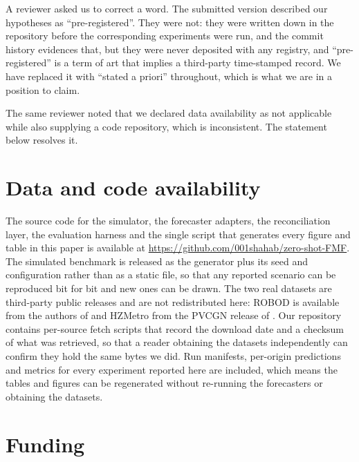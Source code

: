 \documentclass[11pt]{article}
\theoremstyle{plain}
\theoremstyle{definition}
\theoremstyle{remark}
\newif\ifrevisionmarkup
\newcommand{\new}[1]{\ifrevisionmarkup\textcolor{revision}{#1}\else#1\fi}
\begin{document}
\new{A reviewer asked us to correct a word. The submitted version described our hypotheses as ``pre-registered''. They were not: they were written down in the repository before the corresponding experiments were run, and the commit history evidences that, but they were never deposited with any registry, and ``pre-registered'' is a term of art that implies a third-party time-stamped record. We have replaced it with ``stated a priori'' throughout, which is what we are in a position to claim.}

\new{The same reviewer noted that we declared data availability as not applicable while also supplying a code repository, which is inconsistent. The statement below resolves it.}

\section*{\new{Data and code availability}}

\new{The source code for the simulator, the forecaster adapters, the reconciliation layer, the evaluation harness and the single script that generates every figure and table in this paper is available at \url{https://github.com/001shahab/zero-shot-FMF}. The simulated benchmark is released as the generator plus its seed and configuration rather than as a static file, so that any reported scenario can be reproduced bit for bit and new ones can be drawn. The two real datasets are third-party public releases and are not redistributed here: ROBOD is available from the authors of \citet{tekler2022robod} and HZMetro from the PVCGN release of \citet{liu2022pvcgn}. Our repository contains per-source fetch scripts that record the download date and a checksum of what was retrieved, so that a reader obtaining the datasets independently can confirm they hold the same bytes we did. Run manifests, per-origin predictions and metrics for every experiment reported here are included, which means the tables and figures can be regenerated without re-running the forecasters or obtaining the datasets.}

\section*{\new{Funding}}
\end{document}
